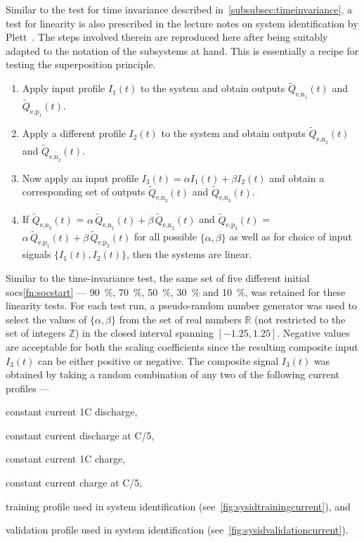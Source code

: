 Similar     to      the     test      for     time      invariance     described
in~\cref{subsubsec:timeinvariance}, a  test for linearity is  also prescribed in
the lecture notes on  system identification by Plett~\cite{PlettECE5560_02}. The
steps involved therein  are reproduced here after being suitably  adapted to the
notation of the subsystems at hand. This is essentially a recipe for testing the
superposition principle.
\begin{enumerate}
    \item Apply input profile $I_1(t)$ to the system and obtain outputs $\widetilde{Q}_{\text{e,n}_1}\!(t)$ and $\widetilde{Q}_{\text{e,p}_1}\!(t)$.
    \item Apply a different profile $I_2(t)$ to the system and obtain outputs $\widetilde{Q}_{\text{e,n}_2}\!(t)$ and $\widetilde{Q}_{\text{e,n}_2}\!(t)$.
    \item Now apply an input profile $I_3(t) = \alpha I_1(t) + \beta I_2(t)$ and obtain a corresponding set of outputs $\widetilde{Q}_{\text{e,n}_3}\!(t)$ and $\widetilde{Q}_{\text{e,n}_3}\!(t)$.
    \item If $\widetilde{Q}_{\text{e,n}_3}\!(t)$ = $\alpha\, \widetilde{Q}_{\text{e,n}_1}\!(t) + \beta \, \widetilde{Q}_{\text{e,n}_2}\!(t)$ and $\widetilde{Q}_{\text{e,p}_3}\!(t)$ = $\alpha\, \widetilde{Q}_{\text{e,p}_1}\!(t) + \beta \, \widetilde{Q}_{\text{e,p}_2}\!(t)$ for all possible $\{\alpha,\beta\}$ as well as for choice of input signals $\{I_1(t),I_2(t)\}$, then the systems are linear.
\end{enumerate}

Similar  to   the  time-invariance  test,   the  same  set  of   five  different
initial  \glspl{soc}\ref{fn:socstart} ---  \SI{90}{\percent}, \SI{70}{\percent},
\SI{50}{\percent},  \SI{30}{\percent} and  \SI{10}{\percent},  was retained  for
these linearity tests.  For each test run, a pseudo-random  number generator was
used to  select the values  of $\{\alpha,\beta\}$ from  the set of  real numbers
$\mathbb{R}$ (not restricted to the set  of integers $\mathbb{Z}$) in the closed
interval spanning  $[-1.25,1.25]$. Negative values  are acceptable for  both the
scaling coefficients since the resulting  composite input $I_3(t)$ can be either
positive or  negative. The composite  signal $I_3(t)$  was obtained by  taking a
random combination of any two of the following current profiles ---
\begin{enumerate*}[label=\emph{\alph*})]
    \item constant current 1C discharge,
    \item constant current discharge at C/5,
    \item constant current 1C charge,
    \item constant current charge at C/5,
    \item training profile used in system identification (see~\cref{fig:sysidtrainingcurrent}), and
    \item validation profile used in system identification (see~\cref{fig:sysidvalidationcurrent}).
\end{enumerate*}


